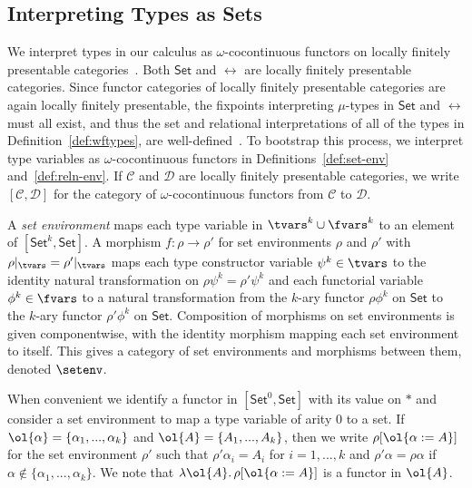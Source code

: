 \documentclass{lmcs}
\theoremstyle{plain}\newtheorem{satz}[thm]{Satz}
\newcommand{\set}{\mathsf{Set}}
\newcommand{\C}{\mathcal{C}}
\newcommand{\D}{\mathcal{D}}
\begin{document}
\subsection{Interpreting Types as Sets}\label{sec:set-interp}

We interpret types in our calculus as $\omega$-cocontinuous functors
on locally finitely presentable categories~\cite{ar94}. Both $\set$
and $\rel$ are locally finitely presentable categories. Since functor
categories of locally finitely presentable categories are again
locally finitely presentable, the fixpoints interpreting $\mu$-types
in $\set$ and $\rel$ must all exist, and thus the set and relational
interpretations of all of the types in Definition~\ref{def:wftypes},
are well-defined~\cite{jp19}. To bootstrap this process, we interpret
type variables as $\omega$-cocontinuous functors in
Definitions~\ref{def:set-env} and~\ref{def:reln-env}. If $\C$ and $\D$
are locally finitely presentable categories, we write $[\C,\D]$ for
the category of $\omega$-cocontinuous functors from $\C$ to $\D$.

\begin{defi}\label{def:set-env}
A {\em set environment} maps each type variable in $\tvars^k \cup
\fvars^k$ to an element of $[\set^k,\set]$.  A morphism $f : \rho \to
\rho'$ for set environments $\rho$ and $\rho'$ with $\rho|_\tvars =
\rho'|_\tvars$ maps each type constructor variable $\psi^k \in \tvars$
to the identity natural transformation on $\rho \psi^k = \rho'\psi^k$
and each functorial variable $\phi^k \in \fvars$ to a natural
transformation from the $k$-ary functor $\rho \phi^k$ on $\set$ to the
$k$-ary functor $\rho' \phi^k$ on $\set$.  Composition of morphisms on
set environments is given componentwise, with the identity morphism
mapping each set environment to itself. This gives a category of set
environments and morphisms between them, denoted $\setenv$.
\end{defi}
When convenient we identify a functor in $[\set^0, \set]$ with its
value on $\ast$ and consider a set environment to map a type variable
of arity $0$ to a set.  If $\ol{\alpha} = \{\alpha_1,...,\alpha_k\}$
and $\ol{A} = \{A_1,...,A_k\}$, then we write $\rho[\ol{\alpha := A}]$
for the set environment $\rho'$ such that $\rho' \alpha_i = A_i$ for
$i = 1,...,k$ and $\rho' \alpha = \rho \alpha$ if $\alpha \not \in
\{\alpha_1,...,\alpha_k\}$. We note that $\lambda \ol{A}.\,
\rho[\ol{\alpha  := A}]$ is a functor in $\ol{A}$.
\end{document}

